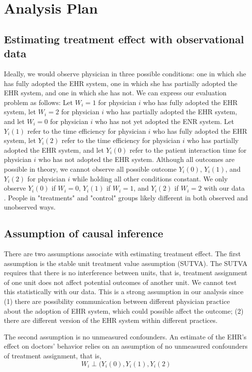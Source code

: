 \documentclass[12pt]{report}
\begin{document}
\chapter{Analysis Plan}
\section{Estimating treatment effect with observational data}
Ideally, we would observe physician in three possible conditions: one in which she has fully adopted the EHR system, one in which she has partially adopted the EHR system, and one in which she has not. We can express our evaluation problem as follows: Let $W_i = 1$ for physician $i$ who has fully adopted the EHR system, let $W_i = 2$ for physician $i$ who has partially adopted the EHR system, and let $W_i = 0$ for physician $i$ who has not yet adopted the ENR system. Let $Y_i(1)$ refer to the time efficiency for physician $i$ who has fully adopted the EHR system, let $Y_i(2)$ refer to the time efficiency for physician $i$ who has partially adopted the EHR system, and let $Y_i(0)$ refer to the patient interaction time for physician $i$ who has not adopted the EHR system. Although all outcomes are possible in theory, we cannot observe all possible outcome $Y_i(0)$, $Y_i(1)$, and $Y_i(2)$ for physician $i$ while holding all other conditions constant. We only observe $Y_i(0)$ if $W_i = 0$, $Y_i(1)$ if $W_i = 1$, and $Y_i(2)$ if $W_i = 2$ with our data \citep{imbens2008recent}. People in "treatments" and "control" groups likely different in both observed and unobserved ways.

\section{Assumption of causal inference}
There are two assumptions associate with estimating treatment effect. The first assumption is the stable unit treatment value assumption (SUTVA). The SUTVA requires that there is no interference between units, that is, treatment assignment of one unit does not affect potential outcomes of another unit. We cannot test this statistically with our data. This is a strong assumption in our analysis since (1) there are possibility communication between different physician practice about the adoption of EHR system, which could possible affect the outcome; (2) there are different version of the EHR system within different practices.

The second assumption is no unmeasured confounders. An estimate of the EHR's effect on doctors' behavior relies on an assumption of no unmeasured confounders of treatment assignment, that is, 
\begin{equation*}
W_i \perp (Y_i(0),Y_i(1),Y_i(2)
\end{equation*}
\end{document}
